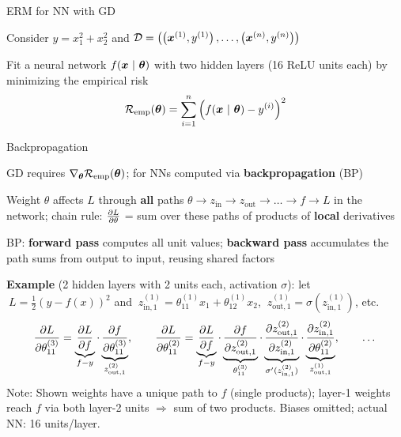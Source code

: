 \documentclass[11pt,compress,t,notes=noshow, xcolor=table]{beamer}
\newcommand{\zin}[2]{z_{\text{in},{#1}}^{(#2)}}
\newcommand{\zout}[2]{z_{\text{out},{#1}}^{(#2)}}
\begin{document}
\begin{framei}{ERM for NN with GD}
\item Consider $y = x_1^2 + x_2^2$ and $\mathcal{D} = \left( \left(\bm{x}^{(1)}, y^{(1)}\right), \ldots, \left(\bm{x}^{(n)}, y^{(n)}\right)\right)$
\vspace{-0.75cm}
\item Fit a neural network $f(\bm{x} ~|~ \bm{\theta})$ with two hidden layers (16 ReLU units each) by minimizing the empirical risk
$$\mathcal{R}_{\text{emp}}(\bm{\theta}) = \sum\limits_{i=1}^n \left(f(\bm{x} ~|~ \bm{\theta}) - y^{(i)}\right)^2$$

\end{framei}


\begin{framei}[fs=footnotesize]{Backpropagation}
\item GD requires $\nabla_{\bm{\theta}} \mathcal{R}_{\text{emp}}(\bm{\theta})$; for NNs computed via \textbf{backpropagation} (BP)
\item Weight $\theta$ affects $L$ through \textbf{all} paths $\theta \to z_{\text{in}} \to z_{\text{out}} \to \dots \to f \to L$ in the network; chain rule: $\frac{\partial{L}}{\partial \theta}$ = sum over these paths of products of \textbf{local} derivatives
\item BP: \textbf{forward pass} computes all unit values; \textbf{backward pass} accumulates the path sums from output to input, reusing shared factors
\item \textbf{Example} (2 hidden layers with 2 units each, activation $\sigma$):
let $\ L = \tfrac{1}{2}(y - f(x))^2$ and
$\ \zin{1}{1} = \theta_{11}^{(1)} x_1 + \theta_{12}^{(1)} x_2$,
$\ \zout{1}{1} = \sigma(\zin{1}{1})$, etc.
$$
\pd{L}{\theta_{11}^{(3)}} = \underbrace{\pd{L}{f}}_{f-y} \cdot \underbrace{\pd{f}{\theta_{11}^{(3)}}}_{{\zout{1}{2}}}, \qquad
\pd{L}{\theta_{11}^{(2)}} = \underbrace{\pd{L}{f}}_{f-y} \cdot \underbrace{\pd{f}{\zout{1}{2}}}_{\theta_{11}^{(3)}} \cdot \underbrace{\pd{\zout{1}{2}}{\zin{1}{2}}}_{\sigma'(\zin{1}{2})} \cdot \underbrace{\pd{\zin{1}{2}}{\theta_{11}^{(2)}}}_{\zout{1}{1}}, \qquad
\dots
$$
\vspace{-1cm}
{\scriptsize
Note: Shown weights have a unique path to $f$ (single products); layer-1 weights reach $f$ via both layer-2 units $\Rightarrow$ sum of two products. Biases omitted; actual NN: 16 units/layer.
}
\end{framei}
\end{document}
